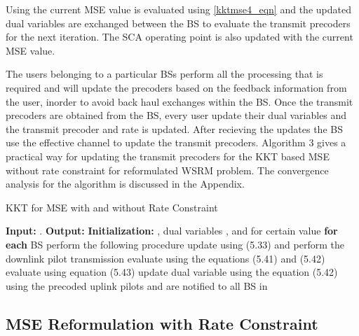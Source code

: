 Using the current \ac{MSE} value  is evaluated using \eqref{kktmse4_eqn} and the updated dual variables are exchanged between the \ac{BS} to evaluate the transmit precoders  for the next iteration. The \ac{SCA} operating point is also updated with the current \ac{MSE} value.

The users belonging to a particular \ac{BS}s perform all the processing that is required and will update the precoders based on the feedback information from the user, inorder to avoid back haul exchanges within the \ac{BS}. Once the transmit precoders are obtained from the \ac{BS}, every user update their dual variables  and the transmit precoder  and rate  is updated. After recieving the updates the \ac{BS} use the effective channel to update the transmit precoders. Algorithm 3 gives a practical way for updating the transmit precoders for the \ac{KKT} based MSE without rate constraint for reformulated \ac{WSRM} problem. The convergence analysis for the algorithm is discussed in the Appendix.

\begin{algorithm}[h]
	\caption[Distributed Precoder Design]{KKT for MSE with and without Rate Constraint}
	\label{algo-2}
	\begin{algorithmic}
		\label{algo--2}
		\STATE \textbf{Input:} .
		\STATE \textbf{Output:} 
		\STATE \textbf{Initialization:}  , dual variables	, and  for certain value
		\REPEAT
		\STATE \textbf{for each} \ac{BS}  perform the following procedure
		\STATE update  using (5.33) and perform the downlink pilot transmission
		\STATE evaluate  using the equations (5.41) and (5.42) 
		\STATE evaluate  using equation (5.43)
		\STATE update dual variable  using the equation (5.42)
		\ENDIF
		\STATE using the precoded uplink pilots  and  are notified to all \ac{BS} in 
		\\
	\end{algorithmic} 
\end{algorithm}

\subsection{MSE Reformulation with Rate Constraint}

